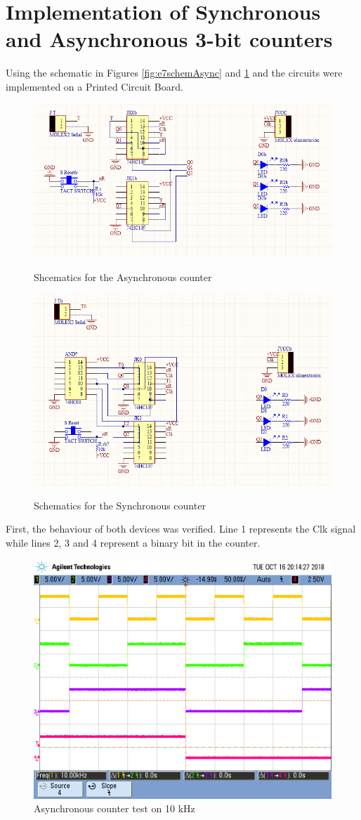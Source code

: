 \documentclass[paper=a4]{article}
\begin{document}
    \section{Implementation of Synchronous and Asynchronous 3-bit counters}
    Using the schematic in Figures \ref{fig:e7schemAsync} and \ref{fig:e7schemSync} and  the circuits were implemented on a Printed Circuit Board.

    \begin{figure}[h!]
        \begin{center}
            \includegraphics[width=0.6\linewidth]{images/aaschem7async.png}
            \caption{Shcematics for the Asynchronous counter}
            \label{fig:e7schemAsync}
            \includegraphics[width=0.6\linewidth]{images/aaschem7sync.png}
            \caption{Schematics for the Synchronous counter}
            \label{fig:e7schemSync}
        \end{center}
    \end{figure}

    First, the behaviour of both devices was verified. Line 1 represents the Clk signal while lines 2, 3 and
    4 represent a binary bit in the counter.
    \begin{figure}[ht]
        \begin{center}
            \includegraphics[width=0.6\linewidth]{images/e3_e7_async0.png}
            \caption{Asynchronous counter test on 10 kHz}
            \label{fig:e7asynctest1}
        \end{center}
    \end{figure}
\end{document}
